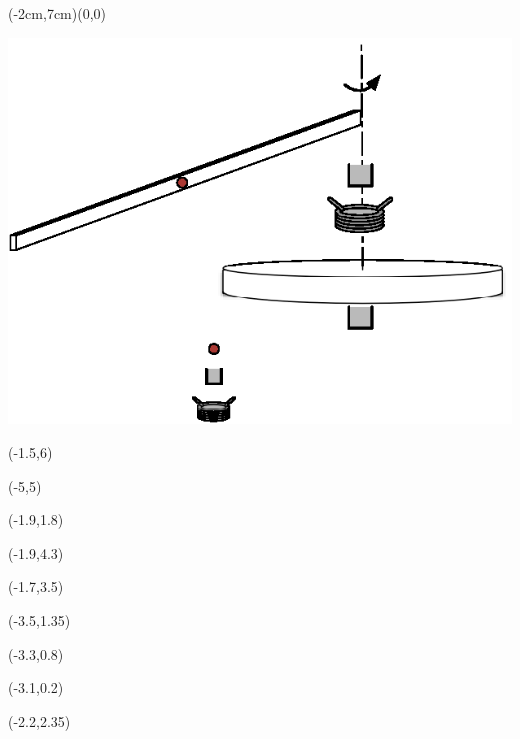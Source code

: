 \documentclass{article}
\begin{document}
\small

\begin{psdraw}(-2cm,7cm)(0,0)

\includegraphics[width=0.7\linewidth]{rotary_flexible_beam_breakdown.eps}


\move(-1.5,6)

\move(-5,5)

\move(-1.9,1.8)

\move(-1.9,4.3)

\move(-1.7,3.5)

\move(-3.5,1.35)

\move(-3.3,0.8)

\move(-3.1,0.2)

\move(-2.2,2.35)

\end{psdraw}
\end{document}
